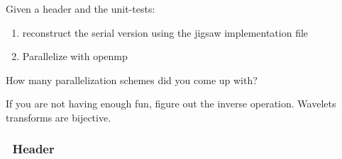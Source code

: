 Given a header and the unit-tests:

\begin{enumerate}
\def\labelenumi{\arabic{enumi}.}
\itemsep1pt\parskip0pt
\item
  reconstruct the serial version using the jigsaw implementation file
\item
  Parallelize with openmp
\end{enumerate}

How many parallelization schemes did you come up with?

If you are not having enough fun, figure out the inverse operation.
Wavelets transforms are bijective.

\subsubsection{~Header}\label{header}

